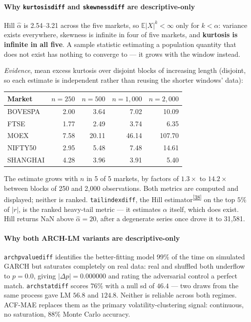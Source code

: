 \documentclass[11pt,a4paper]{article}
\makeatletter
\newcommand{\tcite}[1]{\textsuperscript{[\hyperlink{R:#1}{#1}]}}
\DeclareRobustCommand{\_}{\ifmmode\nfss@text{\textunderscore}\else\textunderscore\allowbreak\fi}
\newcommand{\E}{\mathbb{E}}
\makeatother
\begin{document}
\paragraph{Why \texttt{kurtosis\_diff} and \texttt{skewness\_diff} are descriptive-only} Hill $\hat\alpha$ is 2.54--3.21 across the five markets, so $\E|X|^k<\infty$ only for $k<\alpha$: variance exists everywhere, skewness is infinite in four of five markets, and \textbf{kurtosis is infinite in all five}. A sample statistic estimating a population quantity that does not exist has nothing to converge to --- it grows with the window instead.

\textit{Evidence}, mean excess kurtosis over disjoint blocks of increasing length (disjoint, so each estimate is independent rather than reusing the shorter windows' data):

\begin{center}\footnotesize
\begin{tabular}{@{}lrrrr@{}}
\toprule
Market & $n=250$ & $n=500$ & $n=1{,}000$ & $n=2{,}000$ \\
\midrule
BOVESPA & 2.00 & 3.64 & 7.02 & 10.09 \\
FTSE & 1.77 & 2.49 & 3.74 & 6.35 \\
MOEX & 7.58 & 20.11 & 46.14 & 107.70 \\
NIFTY50 & 2.95 & 5.48 & 7.48 & 14.61 \\
SHANGHAI & 4.28 & 3.96 & 3.91 & 5.40 \\
\bottomrule
\end{tabular}
\end{center}
The estimate grows with $n$ in 5 of 5 markets, by factors of \(1.3\times\) to \(14.2\times\) between blocks of 250 and 2,000 observations. Both metrics are computed and displayed; neither is ranked. \texttt{tail\_index\_diff}, the Hill estimator\tcite{38} on the top $5\%$ of $|r|$, is the ranked heavy-tail metric --- it estimates $\alpha$ itself, which does exist. Hill returns NaN above $\hat\alpha=20$, after a degenerate series once drove it to 31{,}581.

\paragraph{Why both ARCH-LM variants are descriptive-only} \texttt{arch\_pvalue\_diff} identifies the better-fitting model $99\%$ of the time on simulated GARCH but saturates completely on real data: real and shuffled both underflow to $p=0.0$, giving $|\Delta p|=0.000000$ and rating the adversarial control a perfect match. \texttt{arch\_stat\_diff} scores $76\%$ with a null sd of $46.4$ --- two draws from the same process gave LM $56.8$ and $124.8$. Neither is reliable across both regimes. ACF-MAE replaces them as the primary volatility-clustering signal: continuous, no saturation, $88\%$ Monte Carlo accuracy.
\end{document}
